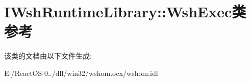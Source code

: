 \hypertarget{class_i_wsh_runtime_library_1_1_wsh_exec}{}\section{I\+Wsh\+Runtime\+Library\+:\+:Wsh\+Exec类 参考}
\label{class_i_wsh_runtime_library_1_1_wsh_exec}


该类的文档由以下文件生成\+:\begin{DoxyCompactItemize}
\item 
E\+:/\+React\+O\+S-\/0../dll/win32/wshom.\+ocx/wshom.\+idl\end{DoxyCompactItemize}
